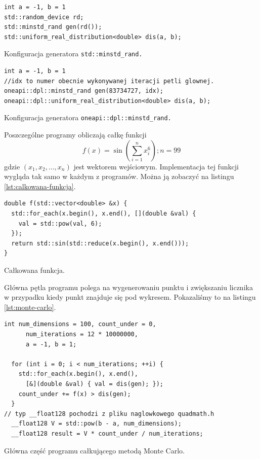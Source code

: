 \documentclass[a4paper,12pt]{book} %
\begin{document}
\begin{lstfloat}
\lstset{language=C++}
\begin{lstlisting}[frame=single]
int a = -1, b = 1
std::random_device rd;
std::minstd_rand gen(rd());
std::uniform_real_distribution<double> dis(a, b);
\end{lstlisting}
\caption{Konfiguracja generatora \texttt{std::minstd\_rand.}}
\label{lst:minstd-rand}
\end{lstfloat}

\begin{lstfloat}
\lstset{language=C++}
\begin{lstlisting}[frame=single]
int a = -1, b = 1
//idx to numer obecnie wykonywanej iteracji petli glownej.
oneapi::dpl::minstd_rand gen(83734727, idx);
oneapi::dpl::uniform_real_distribution<double> dis(a, b);
\end{lstlisting}
\caption{Konfiguracja generatora \texttt{oneapi::dpl::minstd\_rand.}}
\label{lst:minst-rand-SYCL}
\end{lstfloat}

Poszczególne programy obliczają całkę funkcji
$$ f(x) = \sin{(\sum^n_{i=1}x_i^6)}; n=99 $$ gdzie $(x_1, x_2, \ldots, x_n)$ jest wektorem wejściowym.
Implementacja tej funkcji wygląda tak samo w każdym z programów. Można ją zobaczyć na listingu \ref{lst:calkowana-funkcja}.

\begin{lstfloat}
\lstset{language=C++}
\begin{lstlisting}[frame=single]
double f(std::vector<double> &x) {
  std::for_each(x.begin(), x.end(), [](double &val) {
    val = std::pow(val, 6);
  });
  return std::sin(std::reduce(x.begin(), x.end()));
}
\end{lstlisting}
\caption{Całkowana funkcja.}
\label{lst:calkowana-funkcja}
\end{lstfloat}

Główna pętla programu polega na wygenerowaniu punktu i zwiększaniu licznika w przypadku kiedy punkt znajduje się pod wykresem. Pokazaliśmy to na listingu \ref{lst:monte-carlo}.

\begin{lstfloat}
\lstset{language=C++}
\begin{lstlisting}[frame=single]
  int num_dimensions = 100, count_under = 0,
  	  num_iterations = 12 * 10000000,
      a = -1, b = 1;

  for (int i = 0; i < num_iterations; ++i) {
    std::for_each(x.begin(), x.end(),
      [&](double &val) { val = dis(gen); });
    count_under += f(x) > dis(gen);
  }
// typ __float128 pochodzi z pliku naglowkowego quadmath.h
  __float128 V = std::pow(b - a, num_dimensions);
  __float128 result = V * count_under / num_iterations;
\end{lstlisting}
\caption{Główna część programu całkującego metodą Monte Carlo.}
\label{lst:monte-carlo}
\end{lstfloat}
\end{document}
